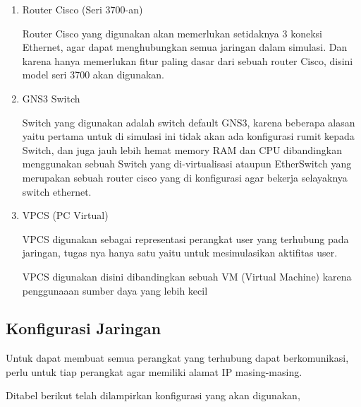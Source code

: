 \documentclass[12pt, a4paper]{article}
\begin{document}
  \begin{enumerate}
    \item Router Cisco (Seri 3700-an)

      Router Cisco yang digunakan akan memerlukan
      setidaknya 3 koneksi Ethernet, agar dapat
      menghubungkan semua jaringan dalam simulasi. Dan karena 
      hanya memerlukan fitur paling dasar dari sebuah router Cisco,
      disini model seri 3700 akan digunakan.

    \item GNS3 Switch

      Switch yang digunakan adalah switch default GNS3, karena beberapa alasan
      yaitu pertama untuk di simulasi ini tidak akan ada konfigurasi rumit
      kepada Switch, dan juga jauh lebih hemat memory RAM dan CPU dibandingkan
      menggunakan sebuah Switch yang di-virtualisasi ataupun EtherSwitch yang
      merupakan sebuah router cisco yang di konfigurasi agar bekerja selayaknya
      switch ethernet.

    \item VPCS (PC Virtual)

      VPCS digunakan sebagai representasi perangkat user yang terhubung pada
      jaringan, tugas nya hanya satu yaitu untuk mesimulasikan aktifitas user.

      VPCS digunakan disini dibandingkan sebuah VM (Virtual Machine) karena
      penggunaaan sumber daya yang lebih kecil

  \end{enumerate}

  \newpage

  \subsection{Konfigurasi Jaringan}

  Untuk dapat membuat semua perangkat yang terhubung dapat berkomunikasi,
  perlu untuk tiap perangkat agar memiliki alamat IP masing-masing.

  Ditabel berikut telah dilampirkan konfigurasi yang akan digunakan,
\end{document}
